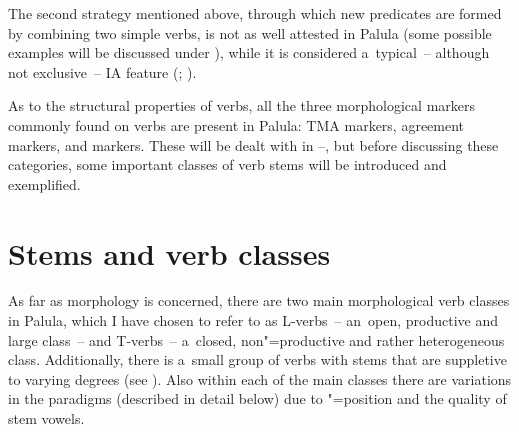 The second strategy mentioned above, through which new predicates are formed by combining two simple verbs, is not as well attested in Palula (some possible examples will be discussed under ), while it is considered a~typical~-- although not exclusive~-- IA feature (\citealt[559]{ebert2006}; \citealt[250--252]{masica2001}). 



As to the structural properties of verbs, all the three morphological markers commonly found on verbs \citep[409]{viberg2006} are present in Palula: TMA markers, agreement markers, and  markers. These will be dealt with in --, but before discussing these  categories, some important classes of verb stems will be introduced and exemplified.


\section{Stems and verb classes}
\label{sec:8-2}


As far as  morphology is concerned, there are two main morphological verb classes in Palula, which I have chosen to refer to as L-verbs~-- an~open, productive and large class~-- and T-verbs~-- a~closed, non"=productive and rather heterogeneous class. Additionally, there is a~small group of verbs with stems that are suppletive to varying degrees (see ). Also within each of the main classes there are variations in the  paradigms (described in detail below) due to "=position and the quality of stem vowels.


